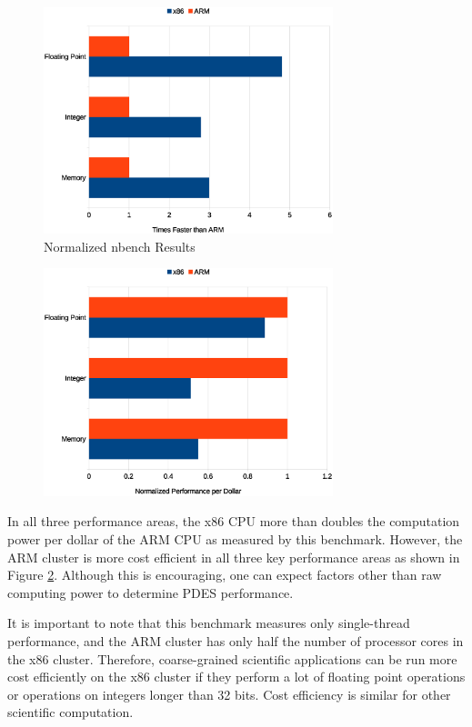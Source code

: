 \documentclass[11pt]{book}
\begin{document}
\begin{figure}
\centering
\includegraphics[width=0.75\textwidth]{nbench_performance}
\caption{Normalized nbench Results}
\label{nbench-performance}
\end{figure}


\begin{figure}
\centering
\includegraphics[width=0.75\textwidth]{nbench_cost}
\label{nbench-cost}
\end{figure}

In all three performance areas, the x86 CPU more than doubles the computation power per
dollar of the ARM CPU as measured by this benchmark.  However, the ARM cluster is more
cost efficient in all three key performance areas as shown in Figure \ref{nbench-cost}.
Although this is encouraging, one can expect factors other than raw computing power to
determine PDES performance.

It is important to note that this benchmark measures only single-thread performance, and
the ARM cluster has only half the number of processor cores in the x86 cluster.
Therefore, coarse-grained scientific applications can be run more cost efficiently on the
x86 cluster if they perform a lot of floating point operations or operations on integers
longer than 32 bits.  Cost efficiency is similar for other scientific computation.
\end{document}
